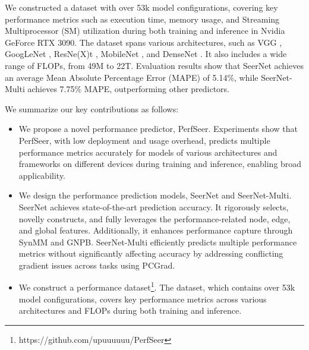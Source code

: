 We constructed a dataset with over 53k model configurations, covering key performance metrics such as execution time, memory usage, and Streaming Multiprocessor (SM) utilization during both training and inference in Nvidia GeForce RTX 3090. 
The dataset spans various architectures, such as VGG \cite{vggnet}, GoogLeNet \cite{googlenet}, ResNe(X)t \cite{resnet,resnext}, MobileNet \cite{Mobilenets}, and DenseNet \cite{densenet}. It also includes a wide range of FLOPs, from 49M to 22T.
Evaluation results show that SeerNet achieves an average Mean Absolute Percentage Error (MAPE) of 5.14\%, while SeerNet-Multi achieves 7.75\% MAPE, outperforming other predictors.

We summarize our key contributions as follows:
\begin{itemize}
    \item We propose a novel performance predictor, PerfSeer.
    Experiments show that PerfSeer, with low deployment and usage overhead, predicts multiple performance metrics accurately for models of various architectures and frameworks on different devices during training and inference, enabling broad applicability.

    \item We design the performance prediction models, SeerNet and SeerNet-Multi.
    SeerNet achieves state-of-the-art prediction accuracy. 
    It rigorously selects, novelly constructs, and fully leverages the performance-related node, edge, and global features. Additionally, it enhances performance capture through SynMM and GNPB.
    SeerNet-Multi efficiently predicts multiple performance metrics without significantly affecting accuracy by addressing conflicting gradient issues across tasks using PCGrad.  

    \item We construct a performance dataset\footnote [1]{https://github.com/upuuuuuu/PerfSeer}.
    The dataset, which contains over 53k model configurations, covers key performance metrics across various architectures and FLOPs during both training and inference.
\end{itemize}
